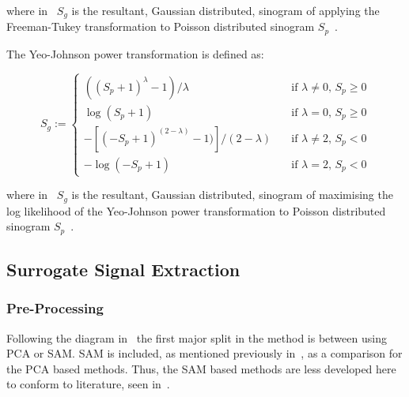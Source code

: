                 \noindent where in~ $S_g$ is the resultant, Gaussian distributed, sinogram of applying the Freeman-Tukey transformation to Poisson distributed sinogram $S_p$~.
                
                The Yeo-Johnson power transformation is defined as:

                \begin{equation} \label{eq:pca_data_driven_surrogate_signal_extraction_methods_for_dynamic_pet_methods_yeo_johnson}
                    S_g := \begin{cases}
                                ((S_p + 1)^\lambda - 1) / \lambda                   & \quad \text{if } \lambda \neq 0 \text{, } S_p \geq 0 \\
                                \log(S_p + 1)                                       & \quad \text{if } \lambda = 0 \text{, } S_p \geq 0    \\
                                -[(-S_p + 1)^{(2 - \lambda)} - 1)] / (2 - \lambda)  & \quad \text{if } \lambda \neq 2 \text{, } S_p < 0    \\
                                -\log(-S_p + 1)                                     & \quad \text{if } \lambda = 2 \text{, } S_p < 0
                            \end{cases}
                \end{equation}

                \noindent where in~ $S_g$ is the resultant, Gaussian distributed, sinogram of maximising the log likelihood of the Yeo-Johnson power transformation to Poisson distributed sinogram $S_p$~.
            
            \subsection{Surrogate Signal Extraction} \label{sec:pca_data_driven_surrogate_signal_extraction_methods_for_dynamic_pet_methods_surrogate_signal_extraction}
                \subsubsection{Pre-Processing} \label{sec:pca_data_driven_surrogate_signal_extraction_methods_for_dynamic_pet_methods_pre_processing}
                    Following the diagram in~ the first major split in the method is between using \gls{PCA} or \gls{SAM}. \gls{SAM} is included, as mentioned previously in~, as a comparison for the \gls{PCA} based methods. Thus, the \gls{SAM} based methods are less developed here to conform to literature, seen in~.
                    
